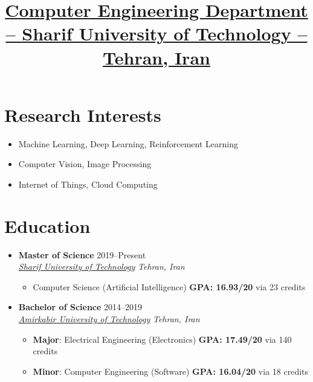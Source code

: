 \documentclass[11pt,a4paper,roman]{moderncv} %
\title{\href{ce.sharif.edu}{\large{\textbf{Computer Engineering Department -- Sharif University of Technology -- Tehran, Iran}}}}
\newcommand*{\authorimg}[1]{%
	\raisebox{-.3\baselineskip}{%
		\texttt{[image: \#1]}%
	}%
}
\begin{document}
	
\makecvtitle
\vspace{-25 pt}

\section{Research Interests}

\begin{itemize}
	\item Machine Learning, Deep Learning, Reinforcement Learning
	\item Computer Vision, Image Processing
	\item Internet of Things, Cloud Computing
\end{itemize}

\section{Education}

\begin{itemize}
	\item \textbf{Master of Science} \hfill 2019--Present \\
	\href{https://en.sharif.edu}{\authorimg{pictures/sut.png} \emph{Sharif University of Technology}} \hfill \emph{Tehran, Iran}
	
	\begin{itemize}
		\item Computer Science (Artificial Intelligence) \hspace{44 pt}  \textbf{GPA: 16.93/20} via 23 credits
	\end{itemize}

	\vspace{3pt}
	
	\item \textbf{Bachelor of Science} \hfill 2014--2019 \\
	\href{https://aut.ac.ir/en}{\authorimg{pictures/aut.png} \emph{Amirkabir University of Technology}} \hfill \emph{Tehran, Iran}
	
	\begin{itemize}
		\item \textbf{Major}: Electrical Engineering (Electronics) \hspace{40 pt}  \textbf{GPA: 17.49/20} via 140 credits
		\item \textbf{Minor}: Computer Engineering (Software) \hspace{45 pt} \textbf{GPA: 16.04/20} via 18 credits
	\end{itemize}
	
\end{itemize}
\end{document}
